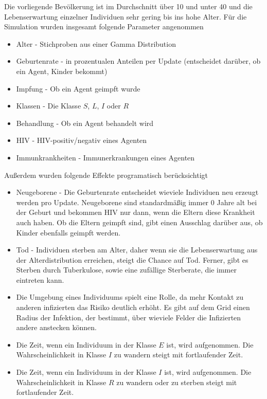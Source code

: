 \documentclass[paper=a4, fontsize=11pt, ngerman, abstract=on]{scrartcl}
\numberwithin{equation}{section} %
\numberwithin{figure}{section} %
\numberwithin{table}{section} %
\begin{document}
Die vorliegende Bevölkerung ist im Durchschnitt über 10 und unter 40 und die Lebenserwartung einzelner Individuen sehr gering bis ins hohe Alter. Für die Simulation wurden insgesamt folgende Parameter angenommen

\begin{itemize}
\item{Alter - Stichproben aus einer Gamma Distribution}
\item{Geburtenrate - in prozentualen Anteilen per Update (entscheidet darüber, ob ein Agent, Kinder bekommt)}
\item{Impfung - Ob ein Agent geimpft wurde}
\item{Klassen - Die Klasse $S$, $L$, $I$ oder $R$}
\item{Behandlung - Ob ein Agent behandelt wird}
\item{HIV - HIV-positiv/negativ eines Agenten}
\item{Immunkrankheiten - Immunerkrankungen eines Agenten}
\end{itemize}

Außerdem wurden folgende Effekte programatisch berücksichtigt

\begin{itemize}
\item{Neugeborene - Die Geburtenrate entscheidet wieviele Individuen neu erzeugt werden pro Update. Neugeborene sind standardmäßig immer 0 Jahre alt bei der Geburt und bekommen HIV nur dann, wenn die Eltern diese Krankheit auch haben. Ob die Eltern geimpft sind, gibt einen Ausschlag darüber aus, ob Kinder ebenfalls geimpft werden.}
\item{Tod - Individuen sterben am Alter, daher wenn sie die Lebenserwartung aus der Alterdistribution erreichen, steigt die Chance auf Tod. Ferner, gibt es Sterben durch Tuberkulose, sowie eine zufällige Sterberate, die immer eintreten kann.}
\item{Die Umgebung eines Individuums spielt eine Rolle, da mehr Kontakt zu anderen infizierten das Risiko deutlich erhöht. Es gibt auf dem Grid einen Radius der Infektion, der bestimmt, über wieviele Felder die Infizierten andere anstecken können.}
\item{Die Zeit, wenn ein Individuum in der Klasse $E$ ist, wird aufgenommen. Die Wahrscheinlichkeit in Klasse $I$ zu wandern steigt mit fortlaufender Zeit.}
\item{Die Zeit, wenn ein Individuum in der Klasse $I$ ist, wird aufgenommen. Die Wahrscheinlichkeit in Klasse $R$ zu wandern oder zu sterben steigt mit fortlaufender Zeit.}
\end{itemize}
\end{document}
